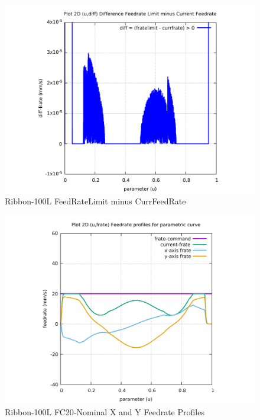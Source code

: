\begin{figure}
	\caption     {Ribbon-100L FeedRateLimit minus CurrFeedRate}
	\label{12-img-Ribbon-100L-FeedRateLimit-minus-CurrFeedRate.pdf}
\includegraphics[width=1.00\textwidth]{Chap4/appendix/app-Ribbon-100L/plots/12-img-Ribbon-100L-FeedRateLimit-minus-CurrFeedRate.pdf}
\end{figure}

\clearpage
\pagebreak

\begin{figure}
	\caption     {Ribbon-100L FC20-Nominal X and Y Feedrate Profiles}
	\label{13-img-Ribbon-100L-FC20-Nominal-X-and-Y-Feedrate-Profiles.pdf}
\includegraphics[width=1.00\textwidth]{Chap4/appendix/app-Ribbon-100L/plots/13-img-Ribbon-100L-FC20-Nominal-X-and-Y-Feedrate-Profiles.pdf}
\end{figure}


